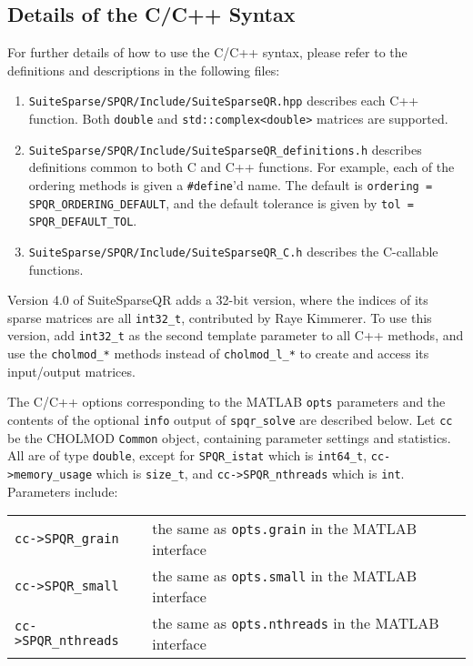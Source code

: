 \documentclass[12pt]{article}
\begin{document}
\subsection{Details of the C/C++ Syntax}

For further details of how to use the C/C++ syntax, please refer to the
definitions and descriptions in the following files:

\begin{enumerate}
\item \verb'SuiteSparse/SPQR/Include/SuiteSparseQR.hpp' describes each
C++ function.  Both \verb'double' and \verb'std::complex<double>' matrices
are supported.

\item \verb'SuiteSparse/SPQR/Include/SuiteSparseQR_definitions.h' describes
definitions \newline common to both C and C++ functions.  For example, each of
the ordering methods is given a \verb'#define''d name.  The default is
\verb'ordering = SPQR_ORDERING_DEFAULT', and the default tolerance is given by
\verb'tol = SPQR_DEFAULT_TOL'.

\item \verb'SuiteSparse/SPQR/Include/SuiteSparseQR_C.h' describes
the C-callable functions.

\end{enumerate}

Version 4.0 of SuiteSparseQR adds a 32-bit version, where the indices of its
sparse matrices are all \verb'int32_t', contributed by Raye Kimmerer.  To use
this version, add \verb'int32_t' as the second template parameter to all C++
methods, and use the \verb'cholmod_*' methods instead of \verb'cholmod_l_*'
to create and access its input/output matrices.

The C/C++ options corresponding to the MATLAB \verb'opts' parameters and the
contents of the optional \verb'info' output of \verb'spqr_solve' are described
below.  Let \verb'cc' be the CHOLMOD \verb'Common' object, containing parameter
settings and statistics.  All are of type \verb'double', except for
\verb'SPQR_istat' which is \verb'int64_t',
\verb'cc->memory_usage' which is
\verb'size_t', and \verb'cc->SPQR_nthreads' which is \verb'int'.  Parameters
include:

\vspace{0.1in}
{\footnotesize
\begin{tabular}{|ll|}
\hline
\verb'cc->SPQR_grain' & the same as \verb'opts.grain' in the MATLAB interface \\
\verb'cc->SPQR_small' & the same as \verb'opts.small' in the MATLAB interface \\
\verb'cc->SPQR_nthreads'
    & the same as \verb'opts.nthreads' in the MATLAB interface \\
\hline
\end{tabular}
}
\vspace{0.1in}
\end{document}
